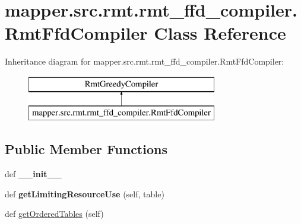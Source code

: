 \hypertarget{classmapper_1_1src_1_1rmt_1_1rmt__ffd__compiler_1_1_rmt_ffd_compiler}{}\section{mapper.\+src.\+rmt.\+rmt\+\_\+ffd\+\_\+compiler.\+Rmt\+Ffd\+Compiler Class Reference}
\label{classmapper_1_1src_1_1rmt_1_1rmt__ffd__compiler_1_1_rmt_ffd_compiler}
Inheritance diagram for mapper.\+src.\+rmt.\+rmt\+\_\+ffd\+\_\+compiler.\+Rmt\+Ffd\+Compiler\+:\begin{figure}[H]
\begin{center}
\leavevmode
\includegraphics[height=2.000000cm]{classmapper_1_1src_1_1rmt_1_1rmt__ffd__compiler_1_1_rmt_ffd_compiler}
\end{center}
\end{figure}
\subsection*{Public Member Functions}
\begin{DoxyCompactItemize}
\item 
\hypertarget{classmapper_1_1src_1_1rmt_1_1rmt__ffd__compiler_1_1_rmt_ffd_compiler_aebeb9e79e7293b474b85e4fb2327d0b8}{}def {\bfseries \+\_\+\+\_\+init\+\_\+\+\_\+}\label{classmapper_1_1src_1_1rmt_1_1rmt__ffd__compiler_1_1_rmt_ffd_compiler_aebeb9e79e7293b474b85e4fb2327d0b8}

\item 
\hypertarget{classmapper_1_1src_1_1rmt_1_1rmt__ffd__compiler_1_1_rmt_ffd_compiler_ab1f8b004da864c0a71abbbb88a6c2455}{}def {\bfseries get\+Limiting\+Resource\+Use} (self, table)\label{classmapper_1_1src_1_1rmt_1_1rmt__ffd__compiler_1_1_rmt_ffd_compiler_ab1f8b004da864c0a71abbbb88a6c2455}

\item 
def \hyperlink{classmapper_1_1src_1_1rmt_1_1rmt__ffd__compiler_1_1_rmt_ffd_compiler_a72d044d7eb34031daeb42909502c0860}{get\+Ordered\+Tables} (self)
\end{DoxyCompactItemize}
